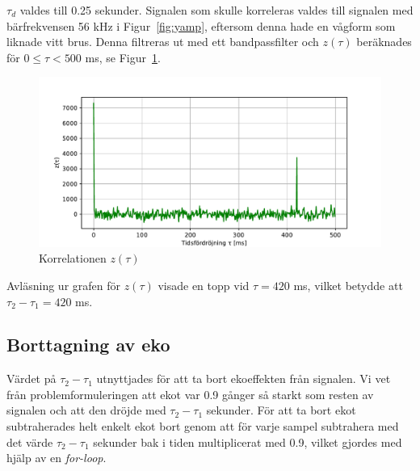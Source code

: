 \documentclass[10pt,twocolumn]{article}
\begin{document}
$\tau_d$ valdes till 0.25 sekunder. Signalen som skulle korreleras valdes till
signalen med bärfrekvensen 56 kHz i Figur~\ref{fig:yamp}, eftersom denna hade
en vågform som liknade vitt brus. Denna filtreras ut med ett bandpassfilter och
$z(\tau)$ beräknades för $0 \leq \tau < 500$ ms, se Figur~\ref{fig:corr}.

\begin{figure}[h]
    \centering
    \includegraphics[width=\linewidth]{figures/corr.pdf}
    \caption{Korrelationen $z(\tau)$}\label{fig:corr}
\end{figure}

Avläsning ur grafen för $z(\tau)$ visade en topp vid $\tau = 420$ ms, vilket
betydde att $\tau_2 - \tau_1 = 420$ ms.

\subsection{Borttagning av eko}
Värdet på $\tau_2 - \tau_1$ utnyttjades för att ta bort ekoeffekten från signalen. Vi
vet från problemformuleringen att ekot var 0.9 gånger så starkt som resten av signalen 
och att den dröjde med $\tau_2 - \tau_1$ sekunder. För
att ta bort ekot subtraherades helt enkelt ekot bort genom att för varje
sampel subtrahera med det värde $\tau_2 - \tau_1$ sekunder bak i tiden multiplicerat
med 0.9, vilket gjordes med hjälp av en \textit{for-loop}.


% 
\end{document}
